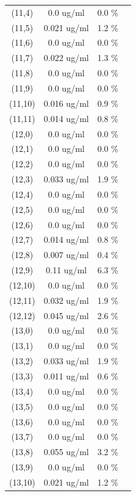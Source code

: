 \documentclass{article}
\begin{document}
\begin{tabular}{c c c c}
(11,4)&        0.0 ug/ml        &0.0 \%\\
(11,5)&        0.021 ug/ml        &1.2 \%\\
(11,6)&        0.0 ug/ml        &0.0 \%\\
(11,7)&        0.022 ug/ml        &1.3 \%\\
(11,8)&        0.0 ug/ml        &0.0 \%\\
(11,9)&        0.0 ug/ml        &0.0 \%\\
(11,10)&        0.016 ug/ml        &0.9 \%\\
(11,11)&        0.014 ug/ml        &0.8 \%\\
(12,0)&        0.0 ug/ml        &0.0 \%\\
(12,1)&        0.0 ug/ml        &0.0 \%\\
(12,2)&        0.0 ug/ml        &0.0 \%\\
(12,3)&        0.033 ug/ml        &1.9 \%\\
(12,4)&        0.0 ug/ml        &0.0 \%\\
(12,5)&        0.0 ug/ml        &0.0 \%\\
(12,6)&        0.0 ug/ml        &0.0 \%\\
(12,7)&        0.014 ug/ml        &0.8 \%\\
(12,8)&        0.007 ug/ml        &0.4 \%\\
(12,9)&        0.11 ug/ml        &6.3 \%\\
(12,10)&        0.0 ug/ml        &0.0 \%\\
(12,11)&        0.032 ug/ml        &1.9 \%\\
(12,12)&        0.045 ug/ml        &2.6 \%\\
(13,0)&        0.0 ug/ml        &0.0 \%\\
(13,1)&        0.0 ug/ml        &0.0 \%\\
(13,2)&        0.033 ug/ml        &1.9 \%\\
(13,3)&        0.011 ug/ml        &0.6 \%\\
(13,4)&        0.0 ug/ml        &0.0 \%\\
(13,5)&        0.0 ug/ml        &0.0 \%\\
(13,6)&        0.0 ug/ml        &0.0 \%\\
(13,7)&        0.0 ug/ml        &0.0 \%\\
(13,8)&        0.055 ug/ml        &3.2 \%\\
(13,9)&        0.0 ug/ml        &0.0 \%\\
(13,10)&        0.021 ug/ml        &1.2 \%\\

\end{tabular}
\end{document}
